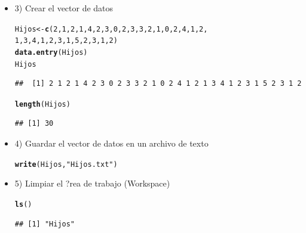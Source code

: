 \documentclass[12pt,letterpaper]{article}\usepackage[]{graphicx}\usepackage[]{color}
\makeatletter
\newcommand{\hlnum}[1]{\textcolor[rgb]{0.686,0.059,0.569}{#1}}%
\newcommand{\hlstr}[1]{\textcolor[rgb]{0.192,0.494,0.8}{#1}}%
\newcommand{\hlstd}[1]{\textcolor[rgb]{0.345,0.345,0.345}{#1}}%
\newcommand{\hlkwb}[1]{\textcolor[rgb]{0.69,0.353,0.396}{#1}}%
\newcommand{\hlkwd}[1]{\textcolor[rgb]{0.737,0.353,0.396}{\textbf{#1}}}%
\newenvironment{kframe}{%
 \def\at@end@of@kframe{}%
 \ifinner\ifhmode%
  \def\at@end@of@kframe{\end{minipage}}%
  \begin{minipage}{\columnwidth}%
 \fi\fi%
 \def\FrameCommand##1{\hskip\@totalleftmargin \hskip-\fboxsep
 \colorbox{shadecolor}{##1}\hskip-\fboxsep
     \hskip-\linewidth \hskip-\@totalleftmargin \hskip\columnwidth}%
 \MakeFramed {\advance\hsize-\width
   \@totalleftmargin\z@ \linewidth\hsize
   \@setminipage}}%
 {\par\unskip\endMakeFramed%
 \at@end@of@kframe}
\newenvironment{knitrout}{}{} %
\makeatother
\begin{document}
\begin {itemize}
\item 3) Crear el vector de datos
\begin{knitrout}
\color{fgcolor}\begin{kframe}
\begin{alltt}
\hlstd{Hijos} \hlkwb{<-} \hlkwd{c}\hlstd{(}\hlnum{2}\hlstd{,} \hlnum{1}\hlstd{,} \hlnum{2}\hlstd{,} \hlnum{1}\hlstd{,} \hlnum{4}\hlstd{,} \hlnum{2}\hlstd{,} \hlnum{3}\hlstd{,} \hlnum{0}\hlstd{,} \hlnum{2}\hlstd{,} \hlnum{3}\hlstd{,} \hlnum{3}\hlstd{,} \hlnum{2}\hlstd{,} \hlnum{1}\hlstd{,} \hlnum{0}\hlstd{,} \hlnum{2}\hlstd{,} \hlnum{4}\hlstd{,} \hlnum{1}\hlstd{,} \hlnum{2}\hlstd{,}
           \hlnum{1}\hlstd{,} \hlnum{3}\hlstd{,} \hlnum{4}\hlstd{,} \hlnum{1}\hlstd{,} \hlnum{2}\hlstd{,} \hlnum{3}\hlstd{,} \hlnum{1}\hlstd{,} \hlnum{5}\hlstd{,} \hlnum{2}\hlstd{,} \hlnum{3}\hlstd{,} \hlnum{1}\hlstd{,} \hlnum{2}\hlstd{)}
\hlkwd{data.entry}\hlstd{(Hijos)}
\hlstd{Hijos}
\end{alltt}
\begin{verbatim}
##  [1] 2 1 2 1 4 2 3 0 2 3 3 2 1 0 2 4 1 2 1 3 4 1 2 3 1 5 2 3 1 2
\end{verbatim}
\begin{alltt}
\hlkwd{length}\hlstd{(Hijos)}
\end{alltt}
\begin{verbatim}
## [1] 30
\end{verbatim}
\end{kframe}
\end{knitrout}
\item 4) Guardar el vector de datos en un archivo de texto
\begin{knitrout}
\color{fgcolor}\begin{kframe}
\begin{alltt}
\hlkwd{write}\hlstd{(Hijos,} \hlstr{"Hijos.txt"}\hlstd{)}
\end{alltt}
\end{kframe}
\end{knitrout}
\item 5) Limpiar el ?rea de trabajo (Workspace)
\begin{knitrout}
\color{fgcolor}\begin{kframe}
\begin{alltt}
\hlkwd{ls}\hlstd{()}
\end{alltt}
\begin{verbatim}
## [1] "Hijos"
\end{verbatim}

\end{kframe}
\end{knitrout}
\end{itemize}
\end{document}
